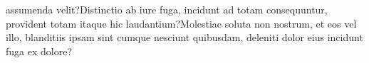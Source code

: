 \documentclass[letterpaper]{article} %
\theoremstyle{theorem}
\theoremstyle{definition}
\theoremstyle{remark}
\begin{document}
assumenda velit?Distinctio ab iure fuga, incidunt ad totam consequuntur, provident totam itaque hic laudantium?Molestiae soluta non nostrum, et eos vel illo, blanditiis ipsam sint cumque nesciunt quibusdam, deleniti dolor eius incidunt fuga ex dolore?\clearpage




\onecolumn
\appendix

\end{document}
